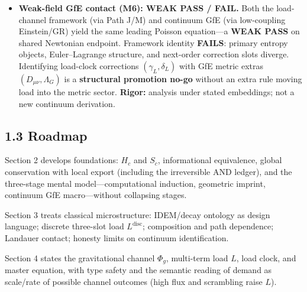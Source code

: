 \documentclass[
  11pt,
]{article}
\begin{document}
\begin{itemize}
  \textbf{Action--Channel Duality, Euclidean warm-up (ACD-EW).} A
  constructive dual between Bianconi's GfE warm-up (induced structure
  metric \(G[\phi]\), Perona--Malik flow) and an observation channel
  with split load and load clock. Residual dual of edge-aware
  reconstruction versus isotropic heat is \textbf{time-windowed} (T1'),
  with a unified pure residual window \(U_\star=[1.36,2.40]\) under a
  soft ensemble conductivity hypothesis \(\mathrm{PCRH}_b\)
  (\(\rho_b=0.42\)). Joint lattice toys score full support on fixed dual
  scorecards as \textbf{pattern witnesses}, not continuum gravity
  confirmation. \textbf{Rigor:} constructive dual + analytic/hybrid
  residual claims; \(\mathrm{PCRH}_b\) soft.
\item
  \textbf{Weak-field GfE contact (M6): WEAK PASS / FAIL.} Both the
  load-channel framework (via Path J/M) and continuum GfE (via
  low-coupling Einstein/GR) yield the same leading Poisson equation---a
  \textbf{WEAK PASS} on shared Newtonian endpoint. Framework identity
  \textbf{FAILS}: primary entropy objects, Euler--Lagrange structure,
  and next-order correction slots diverge. Identifying load-clock
  corrections \((\gamma_L,\delta_L)\) with GfE metric extras
  \((D_{\mu\nu},\Lambda_G)\) is a \textbf{structural promotion no-go}
  without an extra rule moving load into the metric sector.
  \textbf{Rigor:} analysis under stated embeddings; not a new continuum
  derivation.
\end{itemize}

\subsection{1.3 Roadmap}\label{roadmap}

Section 2 develops foundations: \(H_c\) and \(S_c\), informational
equivalence, global conservation with local export (including the
irreversible AND ledger), and the three-stage mental
model---computational induction, geometric imprint, continuum GfE
macro---without collapsing stages.

Section 3 treats classical microstructure: IDEM/decay ontology as design
language; discrete three-slot load \(L^{\mathrm{disc}}\); composition
and path dependence; Landauer contact; honesty limits on continuum
identification.

Section 4 states the gravitational channel \(\Phi_g\), multi-term load
\(L\), load clock, and master equation, with type safety and the
semantic reading of demand as scale/rate of possible channel outcomes
(high flux and scrambling raise \(L\)).
\end{document}
